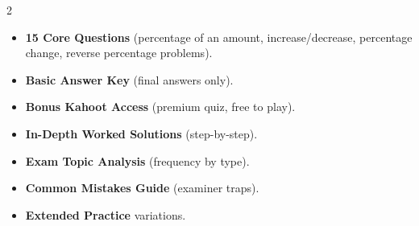 \documentclass[11pt,a4paper]{article}
\newcommand{\FullReleaseDate}{April 30, 2026}
\begin{document}
\vspace{8pt}

\begin{multicols}{2}
  \begin{tcolorbox}[card, title=\sffamily\bfseries\textcolor{white}{\faHandPointDown\ TODAY (Simplified Version)}, colbacktitle=mainblue, boxed title style={sharp corners, boxrule=0pt}]
    \begin{itemize}[leftmargin=1.2em, itemsep=2pt]
      \item \small \textbf{15 Core Questions} (percentage of an amount, increase/decrease, percentage change, reverse percentage problems).
      \item \small \textbf{Basic Answer Key} (final answers only).
      \item \small \textbf{Bonus Kahoot Access} (premium quiz, free to play).
    \end{itemize}
  \end{tcolorbox}

  \columnbreak

  \begin{tcolorbox}[card, title=\sffamily\bfseries\textcolor{white}{\faRocket\ ON \FullReleaseDate\ (Full Upgrade)}, colbacktitle=mainblue, boxed title style={sharp corners, boxrule=0pt}]
    \begin{itemize}[leftmargin=1.2em, itemsep=2pt]
      \item \small \textbf{In-Depth Worked Solutions} (step-by-step).
      \item \small \textbf{Exam Topic Analysis} (frequency by type).
      \item \small \textbf{Common Mistakes Guide} (examiner traps).
      \item \small \textbf{Extended Practice} variations.
    \end{itemize}
  \end{tcolorbox}
\end{multicols}
\end{document}
